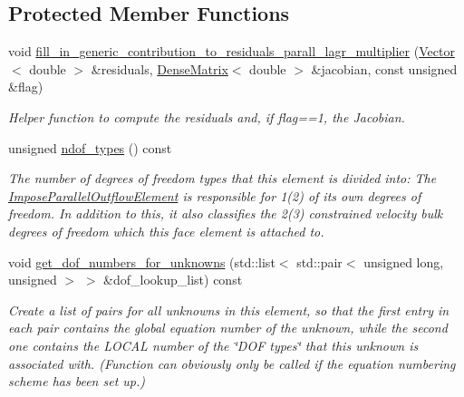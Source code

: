 \subsection*{Protected Member Functions}
\begin{DoxyCompactItemize}
\item 
void \hyperlink{classoomph_1_1ImposeParallelOutflowElement_a34414fec7ca51f720ac5a0a548cd9ef2}{fill\+\_\+in\+\_\+generic\+\_\+contribution\+\_\+to\+\_\+residuals\+\_\+parall\+\_\+lagr\+\_\+multiplier} (\hyperlink{classoomph_1_1Vector}{Vector}$<$ double $>$ \&residuals, \hyperlink{classoomph_1_1DenseMatrix}{Dense\+Matrix}$<$ double $>$ \&jacobian, const unsigned \&flag)
\begin{DoxyCompactList}\small\item\em Helper function to compute the residuals and, if flag==1, the Jacobian. \end{DoxyCompactList}\item 
unsigned \hyperlink{classoomph_1_1ImposeParallelOutflowElement_a3d403d29fdcbbc8954ae360331d03be4}{ndof\+\_\+types} () const
\begin{DoxyCompactList}\small\item\em The number of degrees of freedom types that this element is divided into\+: The \hyperlink{classoomph_1_1ImposeParallelOutflowElement}{Impose\+Parallel\+Outflow\+Element} is responsible for 1(2) of it\textquotesingle{}s own degrees of freedom. In addition to this, it also classifies the 2(3) constrained velocity bulk degrees of freedom which this face element is attached to. \end{DoxyCompactList}\item 
void \hyperlink{classoomph_1_1ImposeParallelOutflowElement_a326aec64731513faa189b7a42856b0fe}{get\+\_\+dof\+\_\+numbers\+\_\+for\+\_\+unknowns} (std\+::list$<$ std\+::pair$<$ unsigned long, unsigned $>$ $>$ \&dof\+\_\+lookup\+\_\+list) const
\begin{DoxyCompactList}\small\item\em Create a list of pairs for all unknowns in this element, so that the first entry in each pair contains the global equation number of the unknown, while the second one contains the L\+O\+C\+AL number of the \char`\"{}\+D\+O\+F types\char`\"{} that this unknown is associated with. (Function can obviously only be called if the equation numbering scheme has been set up.) \end{DoxyCompactList}\end{DoxyCompactItemize}
